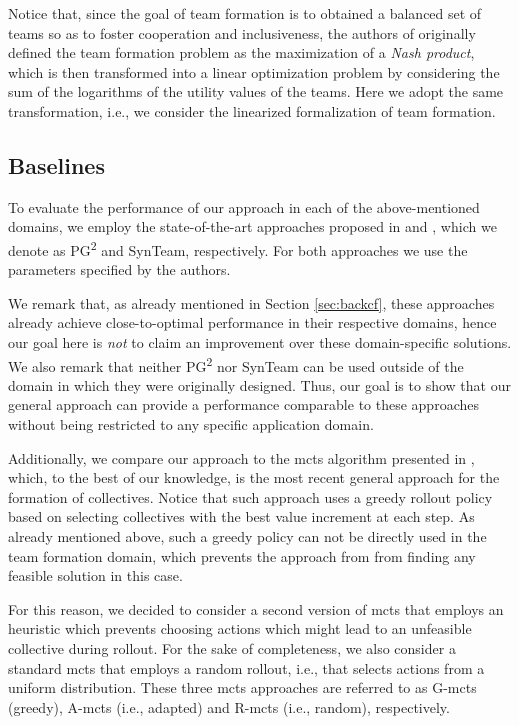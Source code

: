 \documentclass{article}
\theoremstyle{definition}
\begin{document}
Notice that, since the goal of team formation is to obtained a balanced set of teams so as to foster cooperation and inclusiveness, the authors of \cite{andrejczuk2019synergistic} originally defined the team formation problem as the maximization of a \emph{Nash product}, which is then transformed into a linear optimization problem by considering the sum of the logarithms of the utility values of the teams. Here we adopt the same transformation, i.e., we consider the linearized formalization of team formation.

\subsection{Baselines}
\label{sec:baselines}

To evaluate the performance of our approach in each of the above-mentioned domains, we employ the state-of-the-art approaches proposed in \cite{bistaffa2019computational} and \cite{andrejczuk2019synergistic}, which we denote as PG\textsuperscript{2} and SynTeam, respectively.
For both approaches we use the parameters specified by the authors.

We remark that, as already mentioned in Section \ref{sec:backcf}, these approaches already achieve close-to-optimal performance in their respective domains, hence our goal here is \emph{not} to claim an improvement over these domain-specific solutions.
We also remark that neither PG\textsuperscript{2} nor SynTeam can be used outside of the domain in which they were originally designed.
Thus, our goal is to show that our general approach can provide a performance comparable to these approaches without being restricted to any specific application domain.

Additionally, we compare our approach to the \gls{mcts} algorithm presented in \cite{wu2020monte}, which, to the best of our knowledge, is the most recent general approach for the formation of collectives. Notice that such approach uses a greedy rollout policy based on selecting collectives with the best value increment at each step. As already mentioned above, such a greedy policy can not be directly used in the team formation domain, which prevents the approach from \cite{wu2020monte} from finding any feasible solution in this case.

For this reason, we decided to consider a second version of \gls{mcts} that employs an heuristic which prevents choosing actions which might lead to an unfeasible collective during rollout.
For the sake of completeness, we also consider a standard \gls{mcts} that employs a random rollout, i.e., that selects actions from a uniform distribution.
These three \gls{mcts} approaches are referred to as G-\gls{mcts} (greedy), A-\gls{mcts} (i.e., adapted) and R-\gls{mcts} (i.e., random), respectively.
\end{document}
